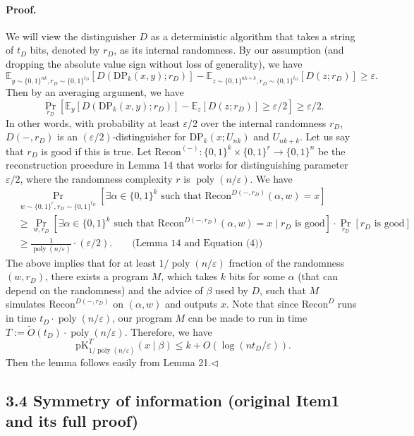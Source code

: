 \paragraph{Proof.} We will view the distinguisher $D$ as a deterministic algorithm that takes a string of $t_D$ bits, denoted by $r_D$, as its internal randomness. By our assumption (and dropping the absolute value sign without loss of generality), we have
\[\mathbb E_{y\sim\{0,1\}^{nk},r_D\sim\{0,1\}^{t_D}}[D(\mathrm{DP}_k(x,y);r_D)]-\mathbb E_{z\sim\{0,1\}^{nk+k},r_D\sim\{0,1\}^{t_D}}[D(z;r_D)]\geq\varepsilon.\]
Then by an averaging argument, we have
\[\Pr_{r_D}\left[\mathbb E_y[D(\mathrm{DP}_k(x,y);r_D)]-\mathbb E_z[D(z;r_D)]\geq\varepsilon/2\right]\geq\varepsilon/2.\tag{4}\]
In other words, with probability at least $\varepsilon/2$ over the internal randomness $r_D$, $D(-,r_D)$ is an $(\varepsilon/2)$-distinguisher for $\mathrm{DP}_k(x;U_{nk})$ and $U_{nk+k}$. Let us say that $r_D$ is good if this is true.
Let $\mathrm{Recon}^{(-)}:\{0,1\}^k\times\{0,1\}^r\to\{0,1\}^n$ be the reconstruction procedure in Lemma 14 that works for distinguishing parameter $\varepsilon/2$, where the randomness complexity $r$ is $\operatorname{poly}(n/\varepsilon)$. We have
\begin{align*}
&\Pr_{w\sim\{0,1\}^r,r_D\sim\{0,1\}^{t_D}}[\exists\alpha\in\{0,1\}^k\text{ such that }\mathrm{Recon}^{D(-,r_D)}(\alpha,w)=x]\\
&\geq\Pr_{w,r_D}[\exists\alpha\in\{0,1\}^k\text{ such that }\mathrm{Recon}^{D(-,r_D)}(\alpha,w)=x\mid r_D\text{ is good}]\cdot\Pr_{r_D}[r_D\text{ is good}]\\
&\geq\frac1{\operatorname{poly}(n/\varepsilon)}\cdot(\varepsilon/2).\qquad\text{(Lemma 14 and Equation (4))}
\end{align*}
The above implies that for at least $1/\operatorname{poly}(n/\varepsilon)$ fraction of the randomness $(w,r_D)$, there exists a program $M$, which takes $k$ bits for some $\alpha$ (that can depend on the randomness) and the advice of $\beta$ used by $D$, such that $M$ simulates $\mathrm{Recon}^{D(-,r_D)}$ on $(\alpha,w)$ and outputs $x$. Note that since $\mathrm{Recon}^D$ runs in time $t_D\cdot\operatorname{poly}(n/\varepsilon)$, our program $M$ can be made to run in time $T:=\widetilde O(t_D)\cdot\operatorname{poly}(n/\varepsilon)$. Therefore, we have
\[\mathrm{pK}_{1/\operatorname{poly}(n/\varepsilon)}^T(x\mid\beta)\leq k+O(\log(nt_D/\varepsilon)).\]
Then the lemma follows easily from Lemma 21.\hfill$\triangleleft$

\subsection*{3.4 Symmetry of information (original Item1 and its full proof)}
